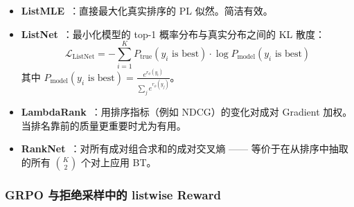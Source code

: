 \begin{keybox}
\begin{itemize}
  \item \textbf{ListMLE}~\cite{xia2008listwise}：直接最大化真实排序的 PL 似然。简洁有效。
  \item \textbf{ListNet}~\cite{cao2007listnet}：最小化模型的 top-1 概率分布与真实分布之间的 KL 散度：
\[
\mathcal{L}_{\text{ListNet}} = -\sum_{i=1}^{K} P_{\text{true}}(y_i \text{ is best}) \cdot \log P_{\text{model}}(y_i \text{ is best})
\]
 其中 $P_{\text{model}}(y_i \text{ is best}) = \frac{e^{r_\phi(y_i)}}{\sum_j e^{r_\phi(y_j)}}$。
  \item \textbf{LambdaRank}~\cite{burges2006lambdarank}：用排序指标（例如 NDCG）的变化对成对 Gradient 加权。当排名靠前的质量更重要时尤为有用。
  \item \textbf{RankNet}~\cite{burges2005ranknet}：对所有成对组合求和的成对交叉熵 —— 等价于在从排序中抽取的所有 $\binom{K}{2}$ 个对上应用 BT。
\end{itemize}
\end{keybox}

\subsubsection*{GRPO 与拒绝采样中的 listwise Reward}
\label{listwise-rewards-for-grpo-and-rejection-sampling}

